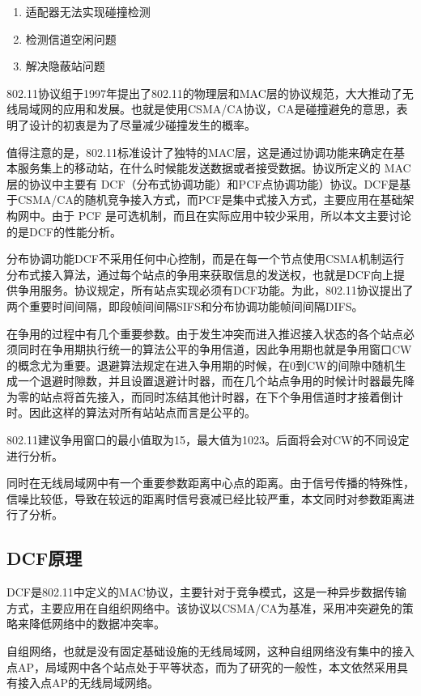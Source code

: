 \documentclass{article}
\begin{document}
\begin{enumerate}
	
	\item {适配器无法实现碰撞检测}
	\item {检测信道空闲问题}
	\item {解决隐蔽站问题}
	
\end{enumerate}

802.11协议组于1997年提出了802.11的物理层和MAC层的协议规范，大大推动了无线局域网的应用和发展。也就是使用CSMA/CA协议，CA是碰撞避免的意思，表明了设计的初衷是为了尽量减少碰撞发生的概率。

值得注意的是，802.11标准设计了独特的MAC层，这是通过协调功能来确定在基本服务集上的移动站，在什么时候能发送数据或者接受数据。协议所定义的 MAC 层的协议中主要有 DCF（分布式协调功能）和PCF点协调功能）协议。DCF是基于CSMA/CA的随机竞争接入方式，而PCF是集中式接入方式，主要应用在基础架构网中。由于 PCF 是可选机制，而且在实际应用中较少采用，所以本文主要讨论的是DCF的性能分析。

分布协调功能DCF不采用任何中心控制，而是在每一个节点使用CSMA机制运行分布式接入算法，通过每个站点的争用来获取信息的发送权，也就是DCF向上提供争用服务。协议规定，所有站点实现必须有DCF功能。为此，802.11协议提出了两个重要时间间隔，即段帧间间隔SIFS和分布协调功能帧间间隔DIFS。

在争用的过程中有几个重要参数。由于发生冲突而进入推迟接入状态的各个站点必须同时在争用期执行统一的算法公平的争用信道，因此争用期也就是争用窗口CW的概念尤为重要。退避算法规定在进入争用期的时候，在0到CW的间隙中随机生成一个退避时隙数，并且设置退避计时器，而在几个站点争用的时候计时器最先降为零的站点将首先接入，而同时冻结其他计时器，在下个争用信道时才接着倒计时。因此这样的算法对所有站站点而言是公平的。

802.11建议争用窗口的最小值取为15，最大值为1023。后面将会对CW的不同设定进行分析。

同时在无线局域网中有一个重要参数距离中心点的距离。由于信号传播的特殊性，信噪比较低，导致在较远的距离时信号衰减已经比较严重，本文同时对参数距离进行了分析。

\subsection{DCF原理}
DCF是802.11中定义的MAC协议，主要针对于竞争模式，这是一种异步数据传输方式，主要应用在自组织网络中。该协议以CSMA/CA为基准，采用冲突避免的策略来降低网络中的数据冲突率。

自组网络，也就是没有固定基础设施的无线局域网，这种自组网络没有集中的接入点AP，局域网中各个站点处于平等状态，而为了研究的一般性，本文依然采用具有接入点AP的无线局域网络。
\end{document}
